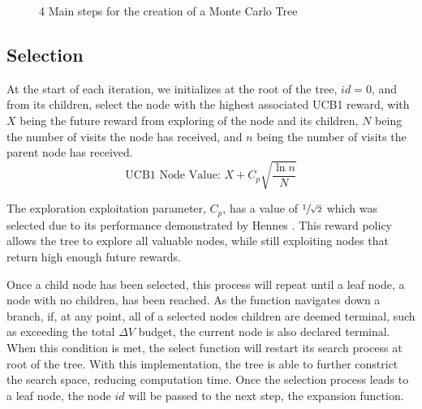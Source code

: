 \documentclass[letterpaper, preprint, paper,11pt]{AAS}	%
\newcommand*\circled[1]{\tikz[baseline=(char.base)]{
            \node[shape=circle,draw,inner sep=0.8pt] (char) {#1};}}
\begin{document}
\begin{figure}[htb]
    \centering
    \caption{4 Main steps for the creation of a Monte Carlo Tree}
    \label{fig:mctsFunc}
\end{figure}

\subsection{Selection}
At the start of each iteration, we initializes at the root of the tree, $id = 0$, and from its children, select the node with the highest associated UCB1 reward, with $X$ being the future reward from exploring of the node and its children, $N$ being the number of visits the node has received, and $n$ being the number of visits the parent node has received.
\begin{equation}
    \label{eq:UCB1}
    \text{UCB1 Node Value: } X + C_p \sqrt{\frac{\ln{n}}{N}}
\end{equation}

The exploration exploitation parameter, $C_p$, has a value of $\sfrac{1}{\sqrt{2}}$ which was selected due to its performance demonstrated by Hennes \cite{Hennes2015}. This reward policy allows the tree to explore all valuable nodes, while still exploiting nodes that return high enough future rewards.

Once a child node has been selected, this process will repeat until a leaf node, a node with no children, has been reached. As the function navigates down a branch, if, at any point, all of a selected nodes children are deemed terminal, such as exceeding the total $\Delta V$ budget, the current node is also declared terminal. When this condition is met, the select function will restart its search process at root of the tree. With this implementation, the tree is able to further constrict the search space, reducing computation time. Once the selection process leads to a leaf node, the node $id$ will be passed to the next step, the expansion function.
\end{document}
